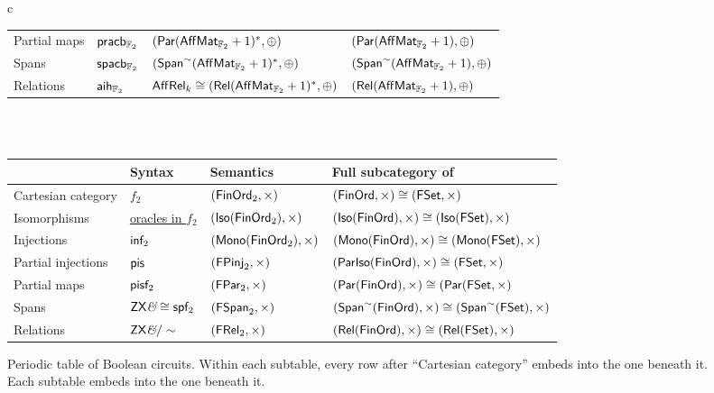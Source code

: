 \documentclass[12pt]{ociamthesis}  %
\begin{document}
\begin{landscape}
\begin{figure}
\begin{tabular}{c}
\begin{tabular}{|llll|}
Partial maps      	& \hyperref[def:paracb]{${\sf pr}{\sf acb}_{\mathbb{F}_2}$}		& \hyperref[lem:paraffcb]{$(\mathsf{Par}(\mathsf{Aff}\mathsf{Mat}_{\mathbb{F}_2}+1)^*,\oplus)$}			&		$(\mathsf{Par}(\mathsf{Aff}\mathsf{Mat}_{\mathbb{F}_2}+1),\oplus)$\\
Spans                 	& \hyperref[def:spanacb]{${\sf sp}{\sf acb}_{\mathbb{F}_2}$}	& \hyperref[lem:spanaffcb]{$(\mathsf{Span}^\sim(\mathsf{Aff}\mathsf{Mat}_{\mathbb{F}_2}+1)^*,\oplus)$}		&		$(\mathsf{Span}^\sim(\mathsf{Aff}\mathsf{Mat}_{\mathbb{F}_2}+1),\oplus)$\\
Relations             	& \hyperref[lem:affrel]{${\sf aih}_{\mathbb{F}_2}$}			& \hyperref[def:affrel]{$\mathsf{Aff}\mathsf{Rel}_{k}\cong(\mathsf{Rel}(\mathsf{Aff}\mathsf{Mat}_{\mathbb{F}_2}+1)^*,\oplus)$}	&		$(\mathsf{Rel}(\mathsf{Aff}\mathsf{Mat}_{\mathbb{F}_2}+1),\oplus)$\\
\hline\hline
\end{tabular}\\
\\
\begin{tabular}{|llll|}
\hline\hline
				&	Syntax									& Semantics										& Full subcategory of\\
\hline
Cartesian category	&	\hyperref[???]{$f_2$} 						& \hyperref[???]{$(\mathsf{FinOrd}_2,\times)$}					& \hyperref[???]{$(\mathsf{FinOrd},\times)\cong (\mathsf{FSet},\times)$}\\
Isomorphisms		&	\hyperref[lem:isof]{oracles in $f_2$} 			& \hyperref[conj:isofinord]{$({\sf Iso}(\mathsf{FinOrd}_2),\times)$}		& $({\sf Iso}(\mathsf{FinOrd}),\times)\cong ({\sf Iso}(\mathsf{FSet}),\times)$\\
Injections			&	\hyperref[def:injf]{${\sf in}\mathsf{f}_2$}					& \hyperref[lem:injand]{$({\sf Mono}(\mathsf{FinOrd}_2),\times)$}		& $({\sf Mono}(\mathsf{FinOrd}),\times)\cong ({\sf Mono}(\mathsf{FSet}),\times)$\\
Partial injections	&	\hyperref[def:parisof]{${\sf pis}$}				& \hyperref[lem:parisof]{$(\mathsf{FPinj}_2,\times)$}				& $(\mathsf{Par}{\sf Iso}(\mathsf{FinOrd}),\times) \cong (\mathsf{FSet},\times)$\\ 
Partial maps 		&	\hyperref[def:parf]{${\sf pis}\mathsf{f}_2$}				& \hyperref[lem:parf]{$(\mathsf{FPar}_2,\times)$}					& $(\mathsf{Par}(\mathsf{FinOrd}),\times)\cong (\mathsf{Par}(\mathsf{FSet},\times)$ \\
Spans 			&	\hyperref[def:spanf2]{$\mathsf{ZX}\textit{\&}\cong {\sf sp}\mathsf{f}_2$}	& \hyperref[lem:spanand]{$(\mathsf{FSpan}_2,\times)$}			& $(\mathsf{Span}^\sim(\mathsf{FinOrd}),\times) \cong (\mathsf{Span}^\sim(\mathsf{FSet}),\times)$ \\
Relations 			& 	\hyperref[cor:bool]{$\mathsf{ZX}\textit{\&}/\sim$}				& \hyperref[cor:bool]{$(\mathsf{FRel}_2,\times)$}					& $(\mathsf{Rel}(\mathsf{FinOrd}),\times)\cong (\mathsf{Rel}(\mathsf{FSet}),\times)$\\
\hline\hline
\end{tabular}
\end{tabular}

\caption{Periodic table of Boolean circuits. Within each subtable, every row after ``Cartesian category''  embeds into the one beneath it. Each subtable embeds into the one beneath it.}
\label{fig:bigtable}
\end{figure}
\end{landscape}



 

\end{document}
